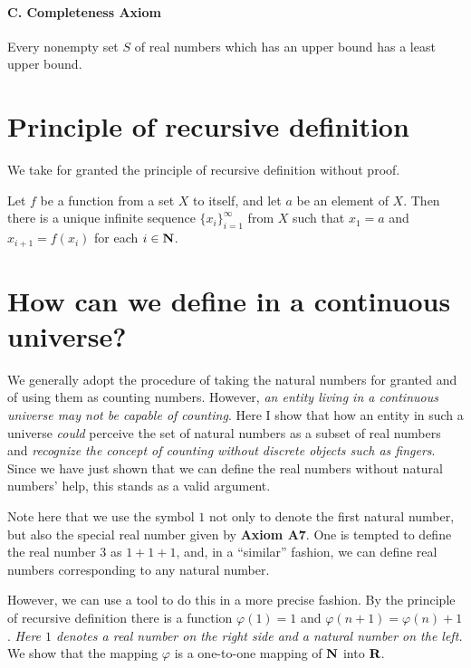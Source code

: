 \documentclass{article}
\begin{document}
\paragraph{C. Completeness Axiom}
Every nonempty set $S$ of real numbers
which has an upper bound has a least upper bound.


\section{Principle of recursive definition}

We take for granted the principle of recursive definition
without proof.

\begin{principle}
Let $f$ be a function from a set $X$ to itself,
and let $a$ be an element of $X$.
Then there is a unique infinite sequence $\{x_i\}_{i=1}^\infty$ from $X$
such that $x_1 = a$ and $x_{i+1} = f(x_i)$ for each $i\in {\mbox{\bf N}}$.
\end{principle}


\section{How can we define in a continuous universe?}

We generally adopt the procedure of taking the natural numbers
for granted and of using them as counting numbers.
However, \emph{an entity living in a continuous universe
may not be capable of counting}.
Here I show that how an entity in such a universe
\emph{could} perceive the set of natural numbers
as a subset of real numbers
and \emph{recognize the concept of counting without discrete objects such as fingers}.
Since we have just shown that we can define the real numbers without natural numbers' help,
this stands as a valid argument.


Note here that we use the symbol $1$ not only to denote the first natural number,
but also the special real number given by {\bf Axiom A7}.
One is tempted to define the real number $3$ as $1 + 1 + 1$,
and, in a ``similar'' fashion,
we can define real numbers corresponding to any natural number.

However, we can use a tool to do this in a more precise fashion.
By the principle of recursive definition
there is a function $\varphi(1) = 1$
and $\varphi(n+1) = \varphi(n) + 1$.
\emph{Here $1$ denotes a real number on the right side and a natural number on the left.}
We show that the mapping $\varphi$ is a one-to-one mapping of ${\mbox{\bf N}}$ into ${\mbox{\bf R}}$.
\end{document}

